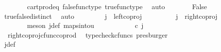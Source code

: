 \begin{isabellebody}
\ \ \ \ \ \ \isamarkupfalse%
\ cart{\isacharunderscore}{\kern0pt}prod{\isacharunderscore}{\kern0pt}eq{}\ false{\isacharunderscore}{\kern0pt}func{\isacharunderscore}{\kern0pt}type\ true{\isacharunderscore}{\kern0pt}func{\isacharunderscore}{\kern0pt}type\ \isamarkupfalse%
\ auto\isanewline
\ \ \ \ \isamarkupfalse%
\ \isamarkupfalse%
\ False\isanewline
\ \ \ \ \ \ \isamarkupfalse%
\ true{\isacharunderscore}{\kern0pt}false{\isacharunderscore}{\kern0pt}distinct\ \isamarkupfalse%
\ auto\isanewline
\ \ \isamarkupfalse%
\isanewline
\ \ \ \ \isamarkupfalse%
\ {\isachardoublequoteopen}j\ {\isasymnoteq}\ left{\isacharunderscore}{\kern0pt}coproj\ {\isasymone}\ {\isasymone}{\isachardoublequoteclose}\isanewline
\ \ \ \ \isamarkupfalse%
\ \isamarkupfalse%
\ {\isachardoublequoteopen}j\ {\isacharequal}{\kern0pt}\ right{\isacharunderscore}{\kern0pt}coproj\ {\isasymone}\ {\isasymone}{\isachardoublequoteclose}\isanewline
\ \ \ \ \ \ \isamarkupfalse%
\ {\isacharparenleft}{\kern0pt}meson\ j{\isacharunderscore}{\kern0pt}def\ maps{\isacharunderscore}{\kern0pt}into{\isacharunderscore}{\kern0pt}{}u{}{\isacharparenright}{\kern0pt}\isanewline
\ \ \ \ \isamarkupfalse%
\ \isamarkupfalse%
\ {\isachardoublequoteopen}{\isacharparenleft}{\kern0pt}{\isasymlangle}{\isasymt}{\isacharcomma}{\kern0pt}\ {\isasymf}{\isasymrangle}\ {\isasymamalg}{\isasymlangle}{\isasymf}{\isacharcomma}{\kern0pt}\ {\isasymt}{\isasymrangle}{\isacharparenright}{\kern0pt}\ {\isasymcirc}\isactrlsub c\ j\ \ {\isacharequal}{\kern0pt}\ {\isasymlangle}{\isasymf}{\isacharcomma}{\kern0pt}\ {\isasymt}{\isasymrangle}{\isachardoublequoteclose}\isanewline
\ \ \ \ \ \ \isamarkupfalse%
\ \ right{\isacharunderscore}{\kern0pt}coproj{\isacharunderscore}{\kern0pt}cfunc{\isacharunderscore}{\kern0pt}coprod\ \isamarkupfalse%
\ {\isacharparenleft}{\kern0pt}typecheck{\isacharunderscore}{\kern0pt}cfuncs{\isacharcomma}{\kern0pt}\ presburger{\isacharparenright}{\kern0pt}\isanewline
\ \ \ \ \isamarkupfalse%
\ \isamarkupfalse%
\ {\isachardoublequoteopen}{\isasymlangle}{\isasymf}{\isacharcomma}{\kern0pt}\ {\isasymt}{\isasymrangle}\ {\isacharequal}{\kern0pt}\ {\isasymlangle}{\isasymt}{\isacharcomma}{\kern0pt}{\isasymt}{\isasymrangle}{\isachardoublequoteclose}\isanewline
\ \ \ \ \ \ \isamarkupfalse%
\ j{\isacharunderscore}{\kern0pt}def\ \isamarkupfalse%

\end{isabellebody}
